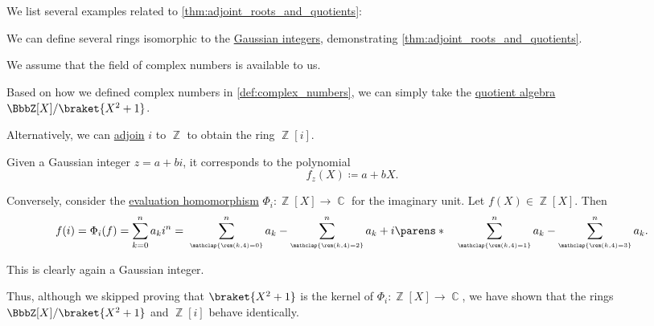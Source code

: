 \begin{example}\label{ex:thm:adjoint_roots_and_quotients}
  We list several examples related to \cref{thm:adjoint_roots_and_quotients}:
  \begin{thmenum}
     We can define several rings isomorphic to the \hyperref[def:gaussian_integers]{Gaussian integers}, demonstrating \cref{thm:adjoint_roots_and_quotients}.

    We assume that the field of complex numbers is available to us.

    \begin{thmenum}
       Based on how we defined complex numbers in \cref{def:complex_numbers}, we can simply take the \hyperref[def:algebra_over_ring/quotient]{quotient algebra} \( \BbbZ[X] / \braket{X^2 + 1} \).

       Alternatively, we can \hyperref[def:semiring_adjunction]{adjoin} \( i \) to \( \BbbZ \) to obtain the ring \( \BbbZ[i] \).

      Given a Gaussian integer \( z = a + bi \), it corresponds to the polynomial
      \begin{equation*}
        f_z(X) \coloneqq a + bX.
      \end{equation*}

      Conversely, consider the \hyperref[con:free_construction/evaluation]{evaluation homomorphism} \( \Phi_i: \BbbZ[X] \to \BbbC \) for the imaginary unit. Let \( f(X) \in \BbbZ[X] \). Then
      \begin{equation*}
        f(i)
        =
        \Phi_i(f)
        =
        \sum_{k=0}^n a_k i^n
        =
        \thickspace \sum_{\scriptscriptstyle{\mathclap{\rem(k, 4) = 0}}}^n a_k - \sum_{\scriptscriptstyle{\mathclap{\rem(k, 4) = 2}}}^n a_k + i \parens*{ \quad \sum_{\scriptscriptstyle{\mathclap{\rem(k, 4) = 1}}}^n a_k - \sum_{\scriptscriptstyle{\mathclap{\rem(k, 4) = 3}}}^n a_k }.
      \end{equation*}

      This is clearly again a Gaussian integer.

      Thus, although we skipped proving that \( \braket{X^2 + 1} \) is the kernel of \( \Phi_i: \BbbZ[X] \to \BbbC \), we have shown that the rings \( \BbbZ[X] / \braket{ X^2 + 1 } \) and \( \BbbZ[i] \) behave identically.
    \end{thmenum}


\end{thmenum}
\end{example}
